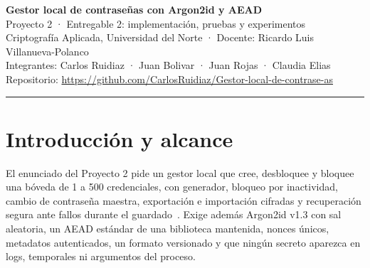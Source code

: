 \documentclass[11pt,letterpaper]{article}
\newcommand{\code}[1]{\texttt{#1}}
\newcommand{\pvlt}{\code{pvlt}}
\begin{document}
\begin{center}
{\LARGE\bfseries\color{tinta} Gestor local de contraseñas con Argon2id y AEAD}\\[3pt]
{\large Proyecto 2 · Entregable 2: implementación, pruebas y experimentos}\\[2pt]
{\small Criptografía Aplicada, Universidad del Norte · Docente: Ricardo Luis Villanueva-Polanco}\\[2pt]
{\small Integrantes: Carlos Ruidiaz · Juan Bolivar · Juan Rojas · Claudia Elias}\\[2pt]
{\small Repositorio: \url{https://github.com/CarlosRuidiaz/Gestor-local-de-contrase-as}}
\end{center}
\vspace{-1ex}
{\color{gris}\rule{\linewidth}{0.4pt}}

\begin{abstract}
\noindent
Se implementó \pvlt, un gestor de contraseñas de un solo usuario que funciona por completo en el equipo, con interfaz web local y un CLI mínimo. La contraseña maestra deriva con Argon2id una clave que envuelve una clave de datos aleatoria, renovada en cada guardado, que cifra el contenido con ChaCha20-Poly1305. La cabecera completa del archivo es dato asociado de ambos cifrados. El producto cumple el diseño del Entregable 1 sin cambios en el formato ni en el protocolo, y lo concreta en los puntos que el diseño dejaba abiertos. Una suite de 673 pruebas automatizadas cubre los trece casos del plan, incluidos manipulación byte a byte, caídas tras cada paso del guardado y ataques contra el servidor local. Los experimentos fijan la configuración final de Argon2id en 256 MiB, 3 pasadas y 4 carriles, que desbloquea en 0,42 s en el equipo de referencia y obliga a un atacante a gastar unas 4\,100 horas de núcleo para recorrer un diccionario del tamaño de RockYou.
\end{abstract}

\section{Introducción y alcance}

El enunciado del Proyecto 2 pide un gestor local que cree, desbloquee y bloquee una bóveda de 1 a 500 credenciales, con generador, bloqueo por inactividad, cambio de contraseña maestra, exportación e importación cifradas y recuperación segura ante fallos durante el guardado~\cite{enunciado}. Exige además Argon2id v1.3 con sal aleatoria, un AEAD estándar de una biblioteca mantenida, nonces únicos, metadatos autenticados, un formato versionado y que ningún secreto aparezca en logs, temporales ni argumentos del proceso.
\end{document}
